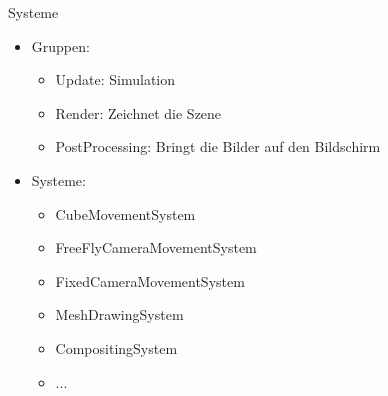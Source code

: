 \documentclass{presentation}
\begin{document}
\begin{frame}{Systeme}
    \begin{itemize}
        \item Gruppen:
        \begin{itemize}
            \item Update: Simulation
            \item Render: Zeichnet die Szene
            \item PostProcessing: Bringt die Bilder auf den Bildschirm
        \end{itemize}
        \item Systeme:
        \begin{itemize}
            \item CubeMovementSystem
            \item FreeFlyCameraMovementSystem
            \item FixedCameraMovementSystem
            \item MeshDrawingSystem
            \item CompositingSystem
            \item ...
        \end{itemize}
    \end{itemize}
\end{frame}
\end{document}
